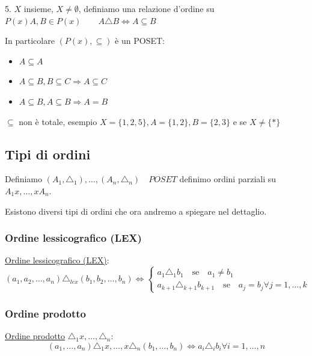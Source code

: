 \documentclass{article}
\theoremstyle{definition}
\begin{document}
5. $ X $ insieme, $ X \not = \emptyset $, definiamo una relazione d'ordine su $ P(x)  A,B \in P(x) \quad \quad A \triangle B \Leftrightarrow A \subseteq B $ \par
In particolare $ (P(x), \subseteq )$ è un POSET:\newline
\begin{itemize}
        \item $ A \subseteq A $
        \item $ A \subseteq B, B \subseteq C \Rightarrow A \subseteq C $
        \item $ A \subseteq B, A \subseteq B \Rightarrow A = B $
\end{itemize}
$ \subseteq $ non è totale, esempio $ X = \{1,2,5\}, A = \{1,2\}, B = \{2,3\} $ e se $ X \not = \{*\} $



\subsection{Tipi di ordini}\label{sec:tipi_di_ordine}
Definiamo $(A_1, \triangle_1), \ldots, (A_n, \triangle_n) \quad POSET$ definimo ordini parziali su $A_1x, \ldots, xA_n$. \par
Esistono diversi tipi di ordini che ora andremo a spiegare nel dettaglio.


        
\subsubsection{Ordine lessicografico (LEX)}\label{sec:ordine_lessicografico_LEX}
\underline{Ordine lessicografico (LEX)}:
\[ 
(a_1,a_2,\ldots, a_n) \triangle_{lex} (b_1,b_2,\ldots, b_n) \Leftrightarrow   
\begin{cases}
        a_1 \triangle_1 b_1 \quad \mbox{se} \quad  a_1 \not = b_1 \\
        a_{k+1} \triangle_{k+1} b_{k+1} \quad \mbox{se} \quad  a_j = b_j \forall j = 1,\ldots, k
\end{cases}
\]


        
\subsubsection{Ordine prodotto}\label{sec:ordine_prodotto}
\underline{Ordine prodotto} $\triangle_1x,\ldots,\triangle_n$:
\begin{equation*}
        (a_1,\ldots,a_n) \triangle_1x,\ldots, x\triangle_n(b_1,\ldots,b_n) \Leftrightarrow a_i \triangle_i b_i \forall i = 1,\ldots,n
\end{equation*}
\end{document}
